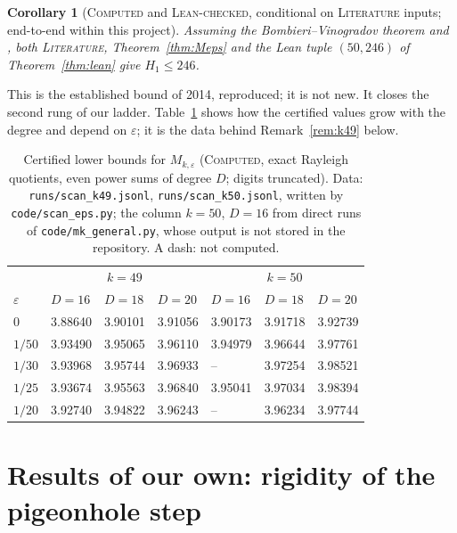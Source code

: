 \documentclass[11pt]{amsart}
\newtheorem{corollary}[theorem]{Corollary}
\theoremstyle{definition}
\theoremstyle{remark}
\newcommand{\lbl}[1]{\textup{\textsc{#1}}}
\begin{document}
\begin{corollary}[\lbl{Computed} and \lbl{Lean-checked}, conditional on \lbl{Literature} inputs; end-to-end within this project]\label{cor:246}
Assuming the Bombieri--Vinogradov theorem and \cite[Thm.~3.12(i)]{Pol14b},
both \lbl{Literature}, Theorem~\ref{thm:Meps} and the Lean tuple $(50,246)$
of Theorem~\ref{thm:lean} give $H_1\le246$.
\end{corollary}

This is the established bound of 2014, reproduced; it is not new. It closes
the second rung of our ladder. Table~\ref{tab:eps} shows how the certified
values grow with the degree and depend on $\varepsilon$; it is the data
behind Remark~\ref{rem:k49} below.

\begin{table}[h]
\caption{Certified lower bounds for $M_{k,\varepsilon}$ (\lbl{Computed}, exact
Rayleigh quotients, even power sums of degree $D$; digits truncated). Data:
\texttt{runs/scan\_k49.jsonl}, \texttt{runs/scan\_k50.jsonl}, written by
\texttt{code/scan\_eps.py}; the column $k=50$, $D=16$ from direct runs of
\texttt{code/mk\_general.py}, whose output is not stored in the repository. A
dash: not computed.}
\label{tab:eps}
\begin{tabular}{@{}lllllll@{}}
\toprule
& \multicolumn{3}{c}{$k=49$} & \multicolumn{3}{c}{$k=50$}\\
$\varepsilon$ & $D=16$ & $D=18$ & $D=20$ & $D=16$ & $D=18$ & $D=20$\\
\midrule
$0$    & 3.88640 & 3.90101 & 3.91056 & 3.90173 & 3.91718 & 3.92739\\
$1/50$ & 3.93490 & 3.95065 & 3.96110 & 3.94979 & 3.96644 & 3.97761\\
$1/30$ & 3.93968 & 3.95744 & 3.96933 & --      & 3.97254 & 3.98521\\
$1/25$ & 3.93674 & 3.95563 & 3.96840 & 3.95041 & 3.97034 & 3.98394\\
$1/20$ & 3.92740 & 3.94822 & 3.96243 & --      & 3.96234 & 3.97744\\
\bottomrule
\end{tabular}
\end{table}

\section{Results of our own: rigidity of the pigeonhole step}
\end{document}
